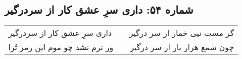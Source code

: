 \begin{center}
\section*{شماره ۵۴: داری سرِ عشق کار از سردرگیر}
\label{sec:054}
\begin{longtable}{l p{0.5cm} r}
داری سرِ عشق کار از سردرگیر
&&
گر مست نیی خمار از سر درگیر
\\
ور نرم نشد چو موم این رمز تُرا
&&
چون شمع هزار بار از سر درگیر
\\
\end{longtable}
\end{center}
